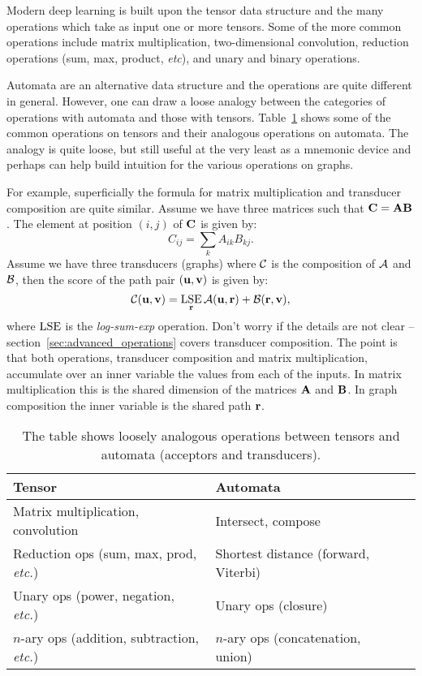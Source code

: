 Modern deep learning is built upon the tensor data structure and the many
operations which take as input one or more tensors. Some of the more common
operations include matrix multiplication, two-dimensional convolution,
reduction operations (sum, max, product, \emph{etc}), and unary and binary
operations.

Automata are an alternative data structure and the operations are quite
different in general. However, one can draw a loose analogy between the categories
of operations with automata and those with tensors.
Table~\ref{tab:tensor_wfst_analogy} shows some of the common operations on
tensors and their analogous operations on automata. The analogy is quite loose,
but still useful at the very least as a mnemonic device and perhaps can help
build intuition for the various operations on graphs.

For example, superficially the formula for matrix multiplication and transducer
composition are quite similar. Assume we have three matrices such that ${\bf C} = {\bf A}
{\bf B}$. The element at position $(i, j)$ of ${\bf C}$ is given by:
\begin{equation}
    C_{ij} = \sum_{k} A_{ik} B_{kj}.
\end{equation}
Assume we have three transducers (graphs) where $\mathcal{C}$ is the composition of
$\mathcal{A}$ and $\mathcal{B}$, then the score of the path pair $({\bf u}, {\bf v})$ is given by:
\begin{equation}
    \mathcal{C}({\bf u}, {\bf v}) = \operatorname*{\textrm{LSE}}_{{\bf r}} \mathcal{A}({\bf u}, {\bf r}) + \mathcal{B}({\bf r}, {\bf v}),
\end{equation}
where $\operatorname*{\textrm{LSE}}$ is the \emph{log-sum-exp} operation. Don't worry if the details
are not clear -- section~\ref{sec:advanced_operations} covers transducer
composition. The point is that both operations, transducer composition and
matrix multiplication, accumulate over an inner variable the values from each
of the inputs. In matrix multiplication this is the shared dimension of the
matrices ${\bf A}$ and ${\bf B}$. In graph composition the inner variable is the shared
path ${\bf r}$.

\begin{table}[ht]
    \small
    \renewcommand{\arraystretch}{1.4}
    \caption{The table shows loosely analogous operations between tensors and
    automata (acceptors and transducers).}
    \centering
    \begin{tabular}{l l l}
    \toprule
        Tensor & Automata \\
    \midrule
        Matrix multiplication, convolution & Intersect, compose \\
        \rowcolor{Gray} Reduction ops (sum, max, prod, \emph{etc.}) & Shortest distance (forward, Viterbi) \\
        Unary ops (power, negation, \emph{etc.})  & Unary ops (closure) \\
        \rowcolor{Gray} $n$-ary ops (addition, subtraction, \emph{etc.})  & $n$-ary ops (concatenation, union) \\
    \bottomrule
    \end{tabular}
    \label{tab:tensor_wfst_analogy}
\end{table}


